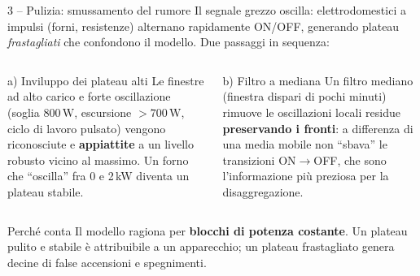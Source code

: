 \documentclass[aspectratio=169]{beamer}
\newcommand{\unit}[1]{\,\mathrm{#1}}
\begin{document}
\begin{frame}{3 -- Pulizia: smussamento del rumore}
  Il segnale grezzo oscilla: elettrodomestici a impulsi (forni, resistenze) alternano rapidamente
  ON/OFF, generando plateau \emph{frastagliati} che confondono il modello. Due passaggi in sequenza:
  \vspace{0.3em}
  \begin{columns}[T]
    \begin{block}{a) Inviluppo dei plateau alti}
      \small
      Le finestre ad alto carico e forte oscillazione (soglia $800\unit{W}$, escursione
      $>700\unit{W}$, ciclo di lavoro pulsato) vengono riconosciute e \textbf{appiattite} a un
      livello robusto vicino al massimo. Un forno che ``oscilla'' fra 0 e 2\,kW diventa
      un plateau stabile.
    \end{block}
    \begin{block}{b) Filtro a mediana}
      \small
      Un filtro mediano (finestra dispari di pochi minuti) rimuove le oscillazioni locali residue
      \textbf{preservando i fronti}: a differenza di una media mobile non ``sbava'' le transizioni
      ON$\to$OFF, che sono l'informazione pi\`u preziosa per la disaggregazione.
    \end{block}
  \end{columns}

  \vspace{0.4em}
  \begin{exampleblock}{Perch\'e conta}
    \small
    Il modello ragiona per \textbf{blocchi di potenza costante}. Un plateau pulito e stabile \`e
    attribuibile a un apparecchio; un plateau frastagliato genera decine di false accensioni e
    spegnimenti.
  \end{exampleblock}
\end{frame}
\end{document}
